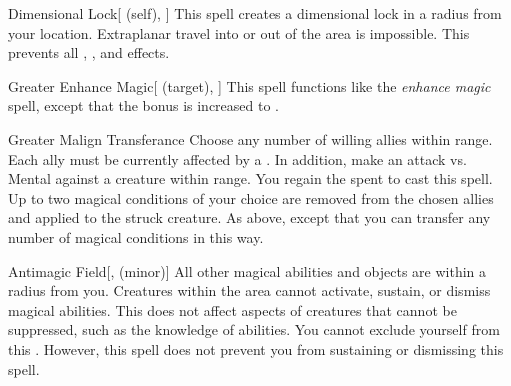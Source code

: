 \lowercase{\hypertarget{spell:Dimensional Lock}{}}\label{spell:Dimensional Lock}
\begin{attuneability}[\nth{4}]{\hypertarget{spell:Dimensional Lock}{Dimensional Lock}}[ (self), ]
This spell creates a dimensional lock in a \arealarge radius  from your location.
Extraplanar travel into or out of the area is impossible.
This prevents all , , and  effects.
\end{attuneability}
\vspace{0.25em}



\lowercase{\hypertarget{spell:Greater Enhance Magic}{}}\label{spell:Greater Enhance Magic}
\begin{attuneability}[\nth{5}]{\hypertarget{spell:Greater Enhance Magic}{Greater Enhance Magic}}[ (target), ]
This spell functions like the \textit{enhance magic} spell, except that the bonus is increased to .
\end{attuneability}
\vspace{0.25em}



\lowercase{\hypertarget{spell:Greater Malign Transferance}{}}\label{spell:Greater Malign Transferance}
\begin{freeability}[\nth{5}]{\hypertarget{spell:Greater Malign Transferance}{Greater Malign Transferance}}
Choose any number of willing allies within \rngmed range.
Each ally must be currently affected by a  .
In addition, make an attack vs. Mental against a creature within \rngmed range.
\miss You regain the  spent to cast this spell.
\hit Up to two magical conditions of your choice are removed from the chosen allies and applied to the struck creature.
\crit As above, except that you can transfer any number of magical conditions in this way.
\end{freeability}
\vspace{0.25em}



\lowercase{\hypertarget{spell:Antimagic Field}{}}\label{spell:Antimagic Field}
\begin{freeability}[\nth{7}]{\hypertarget{spell:Antimagic Field}{Antimagic Field}}[,  (minor)]
All other magical abilities and objects are  within a \areamed radius  from you.
Creatures within the area cannot activate, sustain, or dismiss magical abilities.
This does not affect aspects of creatures that cannot be suppressed, such as the knowledge of abilities.
You cannot exclude yourself from this .
However, this spell does not prevent you from sustaining or dismissing this spell.
\end{freeability}
\vspace{0.25em}


